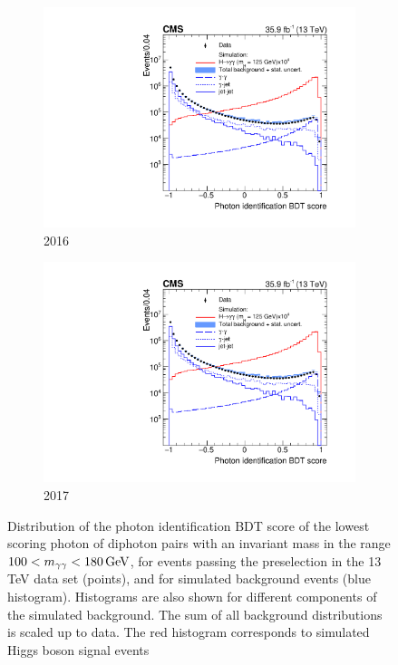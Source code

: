 \begin{figure}[h!]
  \centering
  \begin{subfigure}{0.49\textwidth}
    \includegraphics[width=\textwidth]{Figures/Objects/IDMVA_2016}
    \caption{2016}
    \label{fig:obj_IDMVA_2016}
  \end{subfigure}
  \begin{subfigure}{0.49\textwidth}
    \includegraphics[width=\textwidth]{Figures/Objects/IDMVA_2016}
    \caption{2017}
    \label{fig:obj_IDMVA_2016}
  \end{subfigure}
  \caption{Distribution of the photon identification BDT score of the lowest scoring photon
  of diphoton pairs with an invariant mass in the range $100 < m_{\gamma\gamma} < \SI{180}{GeV}$, for events passing
  the preselection in the 13 TeV data set (points), and for simulated background events (blue
  histogram). Histograms are also shown for different components of the simulated background.
  The sum of all background distributions is scaled up to data. The red histogram corresponds
  to simulated Higgs boson signal events}
  \label{fig:obj_IDMVA}
\end{figure}

